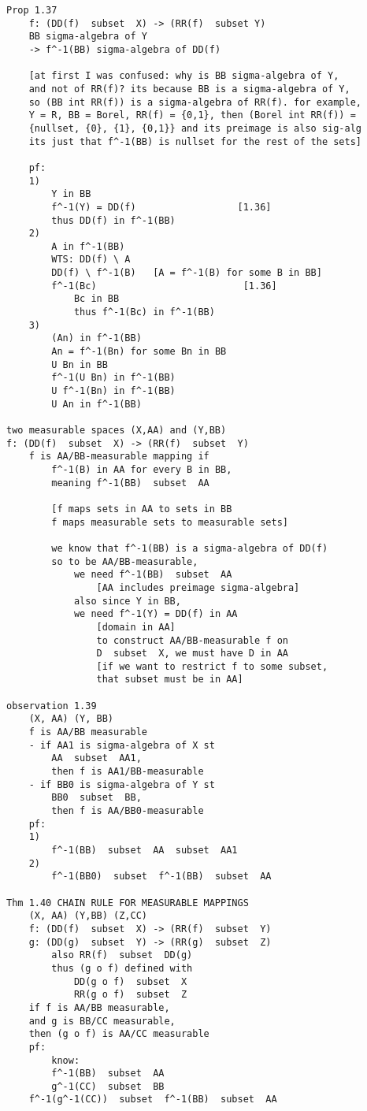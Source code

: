 \documentclass{article}
\begin{document}
\begin{flushleft}
\begin{verbatim}
Prop 1.37
    f: (DD(f)  subset  X) -> (RR(f)  subset Y)
    BB sigma-algebra of Y
    -> f^-1(BB) sigma-algebra of DD(f)
    
    [at first I was confused: why is BB sigma-algebra of Y, 
    and not of RR(f)? its because BB is a sigma-algebra of Y,
    so (BB int RR(f)) is a sigma-algebra of RR(f). for example,
    Y = R, BB = Borel, RR(f) = {0,1}, then (Borel int RR(f)) = 
    {nullset, {0}, {1}, {0,1}} and its preimage is also sig-alg
    its just that f^-1(BB) is nullset for the rest of the sets]

    pf:
    1)
        Y in BB 
        f^-1(Y) = DD(f)                  [1.36]
        thus DD(f) in f^-1(BB)
    2)
        A in f^-1(BB)
        WTS: DD(f) \ A
        DD(f) \ f^-1(B)   [A = f^-1(B) for some B in BB]
        f^-1(Bc)                          [1.36]
            Bc in BB
            thus f^-1(Bc) in f^-1(BB)
    3)
        (An) in f^-1(BB)
        An = f^-1(Bn) for some Bn in BB 
        U Bn in BB 
        f^-1(U Bn) in f^-1(BB)
        U f^-1(Bn) in f^-1(BB)
        U An in f^-1(BB)

two measurable spaces (X,AA) and (Y,BB)
f: (DD(f)  subset  X) -> (RR(f)  subset  Y)
    f is AA/BB-measurable mapping if 
        f^-1(B) in AA for every B in BB,
        meaning f^-1(BB)  subset  AA 

        [f maps sets in AA to sets in BB
        f maps measurable sets to measurable sets]

        we know that f^-1(BB) is a sigma-algebra of DD(f)
        so to be AA/BB-measurable, 
            we need f^-1(BB)  subset  AA 
                [AA includes preimage sigma-algebra]
            also since Y in BB, 
            we need f^-1(Y) = DD(f) in AA
                [domain in AA]
                to construct AA/BB-measurable f on 
                D  subset  X, we must have D in AA 
                [if we want to restrict f to some subset, 
                that subset must be in AA]

observation 1.39
    (X, AA) (Y, BB)
    f is AA/BB measurable 
    - if AA1 is sigma-algebra of X st 
        AA  subset  AA1, 
        then f is AA1/BB-measurable 
    - if BB0 is sigma-algebra of Y st 
        BB0  subset  BB, 
        then f is AA/BB0-measurable
    pf:
    1)
        f^-1(BB)  subset  AA  subset  AA1 
    2)
        f^-1(BB0)  subset  f^-1(BB)  subset  AA 

Thm 1.40 CHAIN RULE FOR MEASURABLE MAPPINGS
    (X, AA) (Y,BB) (Z,CC)
    f: (DD(f)  subset  X) -> (RR(f)  subset  Y)
    g: (DD(g)  subset  Y) -> (RR(g)  subset  Z)
        also RR(f)  subset  DD(g)
        thus (g o f) defined with 
            DD(g o f)  subset  X 
            RR(g o f)  subset  Z 
    if f is AA/BB measurable, 
    and g is BB/CC measurable, 
    then (g o f) is AA/CC measurable 
    pf:
        know:
        f^-1(BB)  subset  AA 
        g^-1(CC)  subset  BB 
    f^-1(g^-1(CC))  subset  f^-1(BB)  subset  AA 


\end{verbatim}
\end{flushleft}
\end{document}
